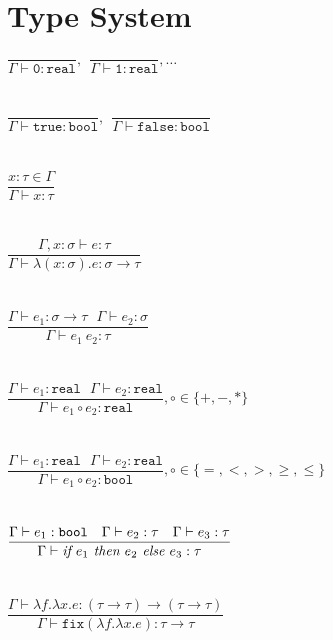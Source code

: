\documentclass{westhesis}
\begin{document}
\section{Type System}
$\dfrac{}{\Gamma \vdash \texttt{0}: \texttt{real}}, \ \ \dfrac{}{\Gamma \vdash \texttt{1}: \texttt{real}}, \ldots$ \\ \\ \\
$\dfrac{}{\Gamma \vdash \texttt{true} : \texttt{bool}}, \ \ \dfrac{}{\Gamma \vdash \texttt{false} : \texttt{bool}}$ \\ \\ \\
$\dfrac{x : \tau \in \Gamma}{\Gamma \vdash x : \tau }$ \\ \\ \\
$\dfrac{\Gamma, x : \sigma \vdash e : \tau}{\Gamma \vdash \lambda (x : \sigma).e : \sigma \rightarrow \tau }$ \\ \\ \\ 
$\dfrac{\Gamma \vdash e_1: \sigma \rightarrow \tau \ \ \ \Gamma \vdash e_2 : \sigma}{\Gamma \vdash e_1 \ e_2 : \tau}$ \\ \\ \\
$\dfrac{\Gamma \vdash e_1 : \texttt{real} \ \ \ \Gamma \vdash e_2 : \texttt{real}}{\Gamma \vdash e_1 \circ e_2 : \texttt{real}}
, \circ \in \{+,-,*\}$ \\ \\ \\
$\dfrac{\Gamma \vdash e_1 : \texttt{real} \ \ \ \Gamma \vdash e_2 : \texttt{real}}{\Gamma \vdash e_1 \circ e_2 : \texttt{bool}}
, \circ \in \{=, <, >, \geq, \leq\}$ \\ \\ \\
$\dfrac{\Gamma \vdash e_1 : \texttt{bool} \ \ \ \Gamma \vdash e_2 : \tau \ \ \ \Gamma \vdash e_3 : \tau}
{\Gamma \vdash \emph{if } e_1 \emph{ then } e_2 \emph{ else } e_3 : \tau} $ \\ \\ \\
$\dfrac{\Gamma \vdash \lambda f. \lambda x.e : (\tau \rightarrow \tau) \rightarrow (\tau \rightarrow \tau)}
{\Gamma \vdash \texttt{fix}(\lambda f. \lambda x.e) : \tau \rightarrow \tau}$ \\ \\ \\ 
\end{document}
